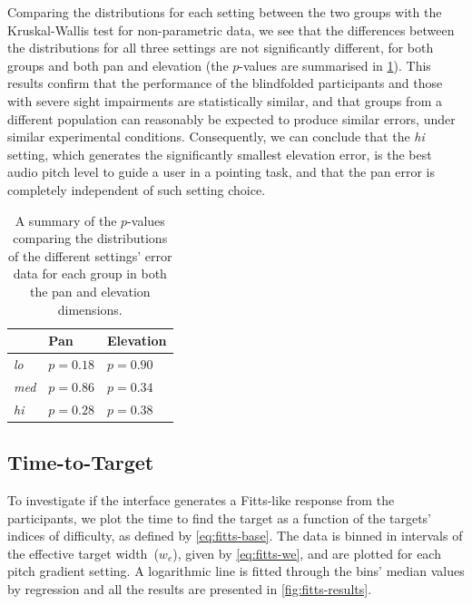 \documentclass[acmsmall]{acmart}
\begin{document}
Comparing the distributions for each setting between the two groups with the Kruskal-Wallis test for non-parametric data, we see that the differences between the distributions for all three settings are not significantly different, for both groups and both pan and elevation (the $p$-values are summarised in \cref{tab:inter-group-results}).
This results confirm that the performance of the blindfolded participants and those with severe sight impairments are statistically similar, and that groups from a different population can reasonably be expected to produce similar errors, under similar experimental conditions. 
Consequently, we can conclude that the \textit{hi} setting, which generates the significantly smallest elevation error, is the best audio pitch level to guide a user in a pointing task, and that the pan error is completely independent of such setting choice. 

\begin{table}
  \centering
  \caption{A summary of the $p$-values comparing the distributions of the different settings' error data for each group in both the pan and elevation dimensions. }\label{tab:inter-group-results}
  \begin{tabular}{lll}
    \toprule
                   & Pan      & Elevation \\ \midrule
      \textit{lo}  & $p=0.18$ & $p=0.90$  \\
      \textit{med} & $p=0.86$ & $p=0.34$  \\
      \textit{hi}  & $p=0.28$ & $p=0.38$  \\
    \bottomrule
  \end{tabular}
\end{table}

\subsection{Time-to-Target}

To investigate if the interface generates a Fitts-like response from the participants, we plot the time to find the target as a function of the targets' indices of difficulty, as defined by \cref{eq:fitts-base}.
The data is binned in intervals of the effective target width~($w_e$), given by \cref{eq:fitts-we}, and are plotted for each pitch gradient setting. 
A logarithmic line is fitted through the bins' median values by regression and all the results are presented in \cref{fig:fitts-results}.
\end{document}
